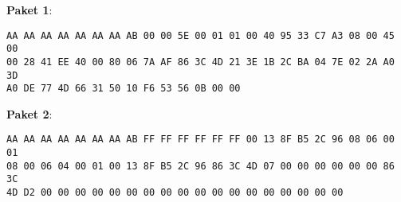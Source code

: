 \documentclass[a4paper]{article}
\begin{document}
\vspace*{5mm}
\textbf{Paket 1}:
\begin{list}{}{\leftmargin=1cm}
\item
\begin{verbatim}
AA AA AA AA AA AA AA AB 00 00 5E 00 01 01 00 40 95 33 C7 A3 08 00 45 00
00 28 41 EE 40 00 80 06 7A AF 86 3C 4D 21 3E 1B 2C BA 04 7E 02 2A A0 3D
A0 DE 77 4D 66 31 50 10 F6 53 56 0B 00 00
\end{verbatim}
\end{list}
\vspace*{5mm}
\textbf{Paket 2}:
\begin{list}{}{\leftmargin=1cm}
\item
\begin{verbatim}
AA AA AA AA AA AA AA AB FF FF FF FF FF FF 00 13 8F B5 2C 96 08 06 00 01
08 00 06 04 00 01 00 13 8F B5 2C 96 86 3C 4D 07 00 00 00 00 00 00 86 3C
4D D2 00 00 00 00 00 00 00 00 00 00 00 00 00 00 00 00 00 00
\end{verbatim}
\end{list}
\end{document}
